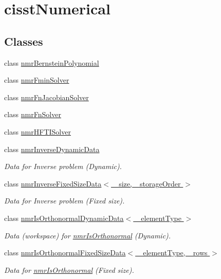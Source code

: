 \hypertarget{group__cisst_numerical}{\section{cisst\-Numerical}
\label{group__cisst_numerical}
}
\subsection*{Classes}
\begin{DoxyCompactItemize}
\item 
class \hyperlink{classnmr_bernstein_polynomial}{nmr\-Bernstein\-Polynomial}
\item 
class \hyperlink{classnmr_fmin_solver}{nmr\-Fmin\-Solver}
\item 
class \hyperlink{classnmr_fn_jacobian_solver}{nmr\-Fn\-Jacobian\-Solver}
\item 
class \hyperlink{classnmr_fn_solver}{nmr\-Fn\-Solver}
\item 
class \hyperlink{classnmr_h_f_t_i_solver}{nmr\-H\-F\-T\-I\-Solver}
\item 
class \hyperlink{classnmr_inverse_dynamic_data}{nmr\-Inverse\-Dynamic\-Data}
\begin{DoxyCompactList}\small\item\em Data for Inverse problem (Dynamic). \end{DoxyCompactList}\item 
class \hyperlink{classnmr_inverse_fixed_size_data}{nmr\-Inverse\-Fixed\-Size\-Data$<$ \-\_\-size, \-\_\-storage\-Order $>$}
\begin{DoxyCompactList}\small\item\em Data for Inverse problem (Fixed size). \end{DoxyCompactList}\item 
class \hyperlink{classnmr_is_orthonormal_dynamic_data}{nmr\-Is\-Orthonormal\-Dynamic\-Data$<$ \-\_\-element\-Type $>$}
\begin{DoxyCompactList}\small\item\em Data (workspace) for \hyperlink{nmr_is_orthonormal_8h_acf0ff1e2dbe0c988db04d9db1e2e7697}{nmr\-Is\-Orthonormal} (Dynamic). \end{DoxyCompactList}\item 
class \hyperlink{classnmr_is_orthonormal_fixed_size_data}{nmr\-Is\-Orthonormal\-Fixed\-Size\-Data$<$ \-\_\-element\-Type, \-\_\-rows $>$}
\begin{DoxyCompactList}\small\item\em Data for \hyperlink{nmr_is_orthonormal_8h_acf0ff1e2dbe0c988db04d9db1e2e7697}{nmr\-Is\-Orthonormal} (Fixed size). \end{DoxyCompactList}\item 

\end{DoxyCompactItemize}
